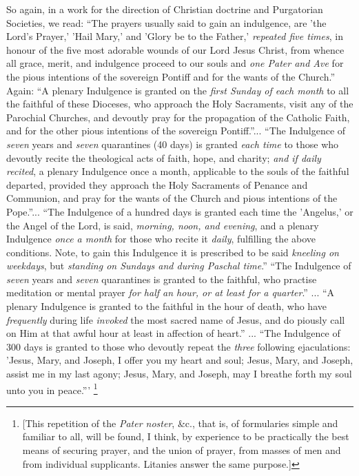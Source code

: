So again, in a work for the direction of Christian doctrine and
Purgatorian Societies, we read: ``The prayers usually said to gain
an indulgence, are 'the Lord's Prayer,' 'Hail Mary,' and 'Glory be to
the Father,' \emph{repeated five times}, in honour of the five most
adorable wounds of our Lord Jesus Christ, from whence all grace,
merit, and indulgence proceed to our souls and \emph{one Pater and Ave}
for the pious intentions of the sovereign Pontiff and for the wants of
the Church.'' Again: ``A plenary Indulgence is granted on the \emph{first
Sunday of each month} to all the faithful of these Dioceses, who
approach the Holy Sacraments, visit any of the Parochial Churches, and
devoutly pray for the propagation of the Catholic Faith, and for the
other pious intentions of the sovereign Pontiff.''... ``The
Indulgence of \emph{seven} years and \emph{seven} quarantines (40
days) is granted \emph{each time} to those who devoutly recite the
theological acts of faith, hope, and charity; \emph{and if daily recited},
a plenary Indulgence once a month, applicable to the souls of the
faithful departed, provided they approach the Holy Sacraments of
Penance and Communion, and pray for the wants of the Church and pious
intentions of the Pope.''... ``The Indulgence of a hundred
days is granted each time the 'Angelus,' or the Angel of the Lord, is
said, \emph{morning, noon, and evening}, and a plenary Indulgence \emph{once
a month} for those who recite it \emph{daily}, fulfilling the above
conditions. Note, to gain this Indulgence it is prescribed to be said \emph{kneeling
on weekdays}, but \emph{standing on Sundays and during Paschal time}.''
``The Indulgence of \emph{seven} years and \emph{seven}
quarantines is granted to the faithful, who practise meditation or
mental prayer \emph{for half an hour, or at least for a quarter}.''
... ``A plenary Indulgence is granted to the faithful in the
hour of death, who have \emph{frequently} during life \emph{invoked}
the most sacred name of Jesus, and do piously call on Him at that
awful hour at least in affection of heart.'' ... ``The
Indulgence of 300 days is granted to those who devoutly repeat the \emph{three}
following ejaculations: 'Jesus, Mary, and Joseph, I offer you my heart
and soul; Jesus, Mary, and Joseph, assist me in my last agony; Jesus,
Mary, and Joseph, may I breathe forth my soul unto you in
peace.''' \footnote{[This repetition of the \emph{Pater noster},
\&c., that is, of formularies simple and familiar to all, will be
found, I think, by experience to be practically the best means of
securing prayer, and the union of prayer, from masses of men and from
individual supplicants. Litanies answer the same purpose.]}

